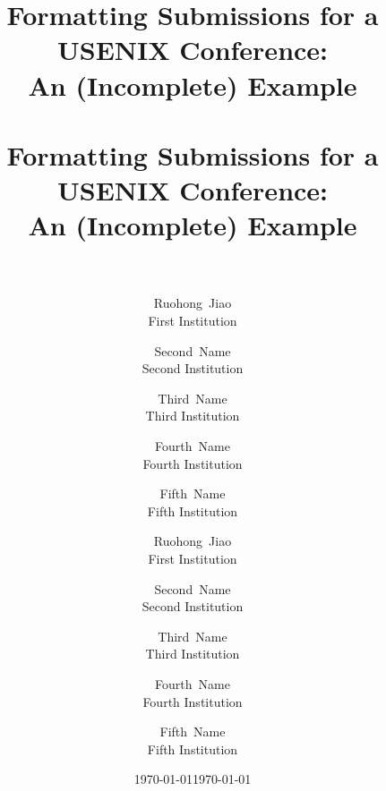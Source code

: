 \ifxetex
\title{\Large\bf Formatting Submissions for a USENIX Conference:\\
	An (Incomplete) Example\\
	\\
}
\author{%
	{\rm Ruohong~Jiao}\\
	First Institution
	\and
	{\rm Second~Name}\\
	Second Institution
	\and
	{\rm Third~Name}\\
	Third Institution
	\and
	{\rm Fourth~Name}\\
	Fourth Institution
	\and
	{\rm Fifth~Name}\\
	Fifth Institution
}
\date{\today}
\else
\title{\Large\bf Formatting Submissions for a USENIX Conference:\\
	An (Incomplete) Example\\
	\\
}
\author{%
	{\rm Ruohong~Jiao}\\
	First Institution
	\and
	{\rm Second~Name}\\
	Second Institution
	\and
	{\rm Third~Name}\\
	Third Institution
	\and
	{\rm Fourth~Name}\\
	Fourth Institution
	\and
	{\rm Fifth~Name}\\
	Fifth Institution
}
\date{\today}
\fi
